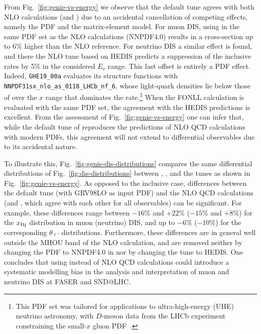 From Fig.~\ref{fig:genie-vs-energy} we observe that the default \genie tune agrees with both NLO calculations (\yadism and \powheg) due to an accidental cancellation of competing effects, namely the PDF and the matrix-element model.
%
For muon DIS, using in \genie the same PDF set as the NLO calculations (NNPDF4.0) results in a cross-section up to 6\% higher than the \yadism NLO reference.
%
For neutrino DIS a similar effect is found, and there the NLO tune based on {\sc\small HEDIS} predicts a suppression of the inclusive rates by 5\% in the considered $E_\nu$ range.
%
This last offset is entirely a PDF effect.
%
Indeed, {\tt GHE19\_00a} evaluates its structure functions with {\tt NNPDF31sx\_nlo\_as\_0118\_LHCb\_nf\_6}, whose light-quark densities lie below those of \nnpdf over the $x$ range that dominates the rate.\footnote{This PDF set was tailored for applications to ultra-high-energy (UHE) neutrino astronomy, with $D$-meson data from the LHCb experiment constraining the small-$x$ gluon PDF~\cite{Gauld:2016kpd}.} 
%
When the \yadism FONLL calculation is evaluated with the same PDF set, the agreement with the  {\sc\small HEDIS} predictions is excellent. 
%
From the assessment of Fig.~\ref{fig:genie-vs-energy} one can infer that, while the default tune of \genie reproduces the predictions of NLO QCD calculations with modern PDFs, this agreement will not extend to differential observables due to its accidental nature.

To illustrate this,  Fig.~\ref{fig:genie-dis-distributions} compares the same differential distributions of Fig.~\ref{fig:dis-distributions} between \yadism, \powheg, and the \genie tunes as shown in Fig.~\ref{fig:genie-vs-energy}.
%
As opposed to the inclusive case, differences between the default \genie tune (with GRV98LO as input PDF) and the NLO QCD calculations (\yadism and \powheg, which agree with each other for all observables) can be significant.
%
For example, these differences range between $-16\%$ and $+22\%$ ($-15\%$ and $+8\%$) for the $x_{\rm Bj}$ distribution in muon (neutrino) DIS, and up to $-6\%$ ($-10\%$) for the corresponding $\theta_{\ell'}$ distributions.
%
Furthermore, these differences are in general well outside the MHOU band of the NLO calculation, and are removed neither by changing the PDF to NNPDF4.0 in \genie nor by changing the tune to {\sc\small HEDIS}. 
%
One concludes that using \genie instead of NLO QCD calculations could introduce a systematic modelling bias in the analysis and interpretation of muon and neutrino DIS at FASER and SND@LHC.

